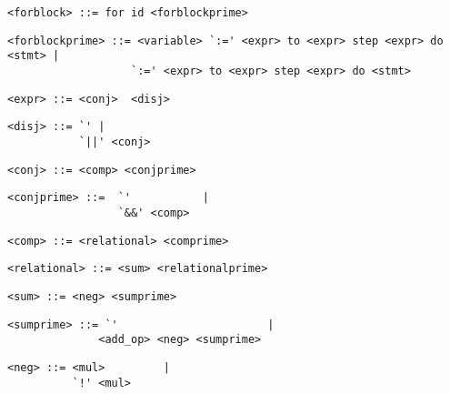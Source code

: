 \begin{footnotesize}
\begin{lstlisting}[frame=single, label={forblock}, language=pie]
<forblock> ::= for id <forblockprime>
\end{lstlisting}

\begin{lstlisting}[frame=single, label={forblockprime}, language=pie]
<forblockprime> ::= <variable> `:=' <expr> to <expr> step <expr> do <stmt> |
                   `:=' <expr> to <expr> step <expr> do <stmt>
\end{lstlisting}

\begin{lstlisting}[frame=single, label={expr}, language=pie]
<expr> ::= <conj>  <disj>
\end{lstlisting}

\begin{lstlisting}[frame=single, label={disj}, language=pie]
<disj> ::= `' |
           `||' <conj>
\end{lstlisting}

\begin{lstlisting}[frame=single, label={conj}, language=pie]
<conj> ::= <comp> <conjprime>
\end{lstlisting}

\begin{lstlisting}[frame=single, label={conjprime}, language=pie]
<conjprime> ::=  `'           | 
                 `&&' <comp>
\end{lstlisting}

\begin{lstlisting}[frame=single, label={comp}, language=pie]
<comp> ::= <relational> <comprime>
\end{lstlisting}

\begin{lstlisting}[frame=single, label={relational}, language=pie]
<relational> ::= <sum> <relationalprime>
\end{lstlisting}

\begin{lstlisting}[frame=single, label={sum}, language=pie]
<sum> ::= <neg> <sumprime>
\end{lstlisting}

\begin{lstlisting}[frame=single, label={sumprime}, language=pie]
<sumprime> ::= `'                       | 
              <add_op> <neg> <sumprime>
\end{lstlisting}

\begin{lstlisting}[frame=single, label={neg}, language=pie]
<neg> ::= <mul>         | 
          `!' <mul>
\end{lstlisting}


\end{footnotesize}
